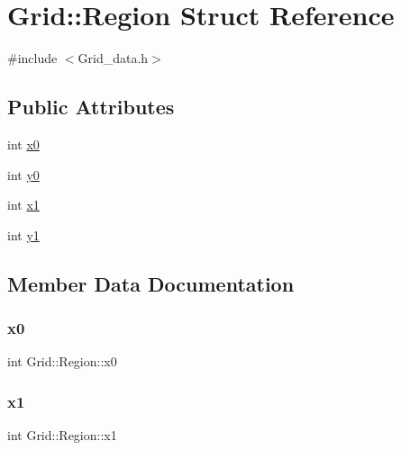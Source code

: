 \hypertarget{struct_grid_1_1_region}{}\section{Grid\+:\+:Region Struct Reference}
\label{struct_grid_1_1_region}


{\ttfamily \#include $<$Grid\+\_\+data.\+h$>$}

\subsection*{Public Attributes}
\begin{DoxyCompactItemize}
\item 
int \mbox{\hyperlink{struct_grid_1_1_region_ac21742bb0e67fe63d9762f0736f54c31}{x0}}
\item 
int \mbox{\hyperlink{struct_grid_1_1_region_aeb7fb84966ca292644218912da95dd96}{y0}}
\item 
int \mbox{\hyperlink{struct_grid_1_1_region_a7dd32789e00e0579dd6106c40026c0c5}{x1}}
\item 
int \mbox{\hyperlink{struct_grid_1_1_region_ab2e35ce7ae8e349ae041c889a05257d7}{y1}}
\end{DoxyCompactItemize}


\subsection{Member Data Documentation}
\mbox{\label{struct_grid_1_1_region_ac21742bb0e67fe63d9762f0736f54c31}} 
\subsubsection{\texorpdfstring{x0}{x0}}
{\footnotesize\ttfamily int Grid\+::\+Region\+::x0}

\mbox{\label{struct_grid_1_1_region_a7dd32789e00e0579dd6106c40026c0c5}} 
\subsubsection{\texorpdfstring{x1}{x1}}
{\footnotesize\ttfamily int Grid\+::\+Region\+::x1}

